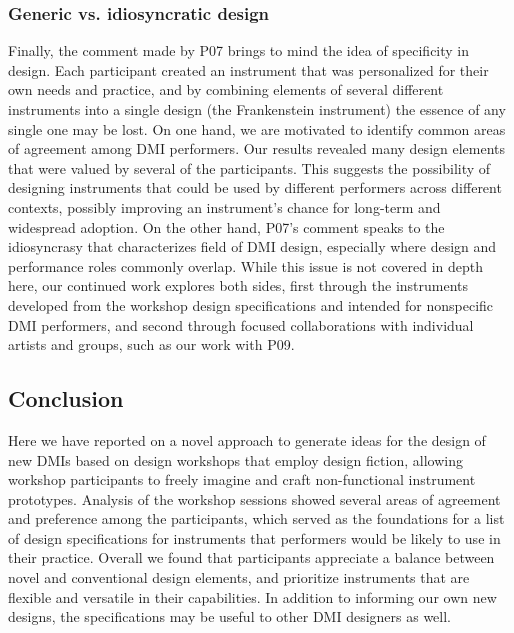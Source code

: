 \documentclass[letterpaper, 12pt]{article}
\begin{document}
\subsubsection{Generic vs. idiosyncratic design}
\label{sec:generic-vs-idiosyncratic-design}

Finally, the comment made by P07 brings to mind the idea of specificity in design. Each participant created an instrument that was personalized for their own needs and practice, and by combining elements of several different instruments into a single design (the Frankenstein instrument) the essence of any single one may be lost. On one hand, we are motivated to identify common areas of agreement among DMI performers. Our results revealed many design elements that were valued by several of the participants. This suggests the possibility of designing instruments that could be used by different performers across different contexts, possibly improving an instrument's chance for long-term and widespread adoption. On the other hand, P07's comment speaks to the idiosyncrasy that characterizes field of DMI design, especially where design and performance roles commonly overlap. While this issue is not covered in depth here, our continued work explores both sides, first through the instruments developed from the workshop design specifications and intended for nonspecific DMI performers, and second through focused collaborations with individual artists and groups, such as our work with P09.

\subsection{Conclusion}
\label{sec:conclusion}

Here we have reported on a novel approach to generate ideas for the design of new DMIs based on design workshops that employ design fiction, allowing workshop participants to freely imagine and craft non-functional instrument prototypes. Analysis of the workshop sessions showed several areas of agreement and preference among the participants, which served as the foundations for a list of design specifications for instruments that performers would be likely to use in their practice. Overall we found that participants appreciate a balance between novel and conventional design elements, and prioritize instruments that are flexible and versatile in their capabilities. In addition to informing our own new designs, the specifications may be useful to other DMI designers as well. 
\end{document}
